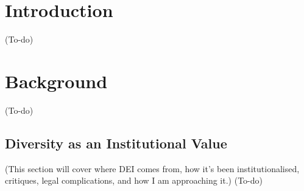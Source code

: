 \section{Introduction}
(To-do)

\section{Background}
(To-do)

\subsection{Diversity as an Institutional Value}
(This section will cover where DEI comes from, how it's been institutionalised, critiques, legal complications, and how I am approaching it.)
(To-do)








